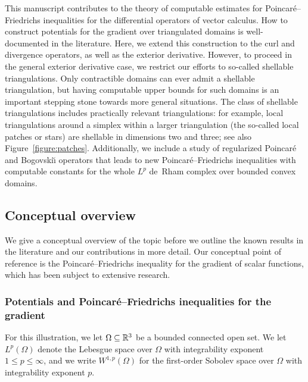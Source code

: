 \documentclass[10pt,a4paper]{article}
\newcommand{\todo}[1]{{\color{RedOrange}\textbf{#1}}}
\begin{document}
This manuscript contributes to the theory of computable estimates for Poincar\'e--Friedrichs inequalities for the differential operators of vector calculus. 
How to construct potentials for the gradient over triangulated domains is well-documented in the literature. 
Here, we extend this construction to the curl and divergence operators, as well as the exterior derivative. 
However, to proceed in the general exterior derivative case, we restrict our efforts to so-called shellable triangulations. 
Only contractible domains can ever admit a shellable triangulation, but having computable upper bounds for such domains is an important stepping stone towards more general situations. 
The class of shellable triangulations includes practically relevant triangulations: 
for example, local triangulations around a simplex 
within a larger triangulation (the so-called local patches or stars) are shellable in dimensions two and three; see also Figure~\ref{figure:patches}. 
Additionally, we include a study of regularized Poincar\'e and Bogovski\u{\i} operators that leads to new Poincar\'e--Friedrichs inequalities with computable constants for the whole $L^{p}$ de~Rham complex over bounded convex domains.




\subsection{Conceptual overview}

We give a conceptual overview of the topic before we outline the known results in the literature and our contributions in more detail. 
Our conceptual point of reference is the Poincar\'e--Friedrichs inequality for the gradient of scalar functions, 
which has been subject to extensive research.


\subsubsection{Potentials and Poincar\'e--Friedrichs inequalities for the gradient}

For this illustration, we let $\Omega \subseteq {\mathbb R}^3$ be a bounded connected open set. 
We let $L^{p}(\Omega)$ denote the Lebesgue space over $\Omega$ with integrability exponent $1 \leq p \leq \infty$, 
and we write $W^{1,p}(\Omega)$ for the first-order Sobolev space over $\Omega$ with integrability exponent $p$. 
\end{document}
